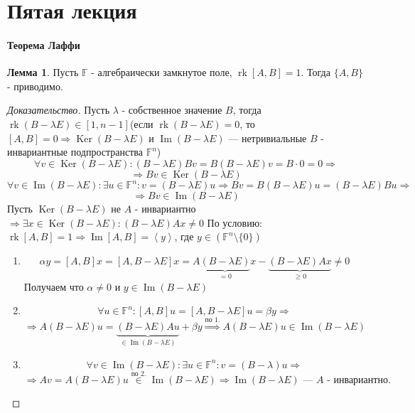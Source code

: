 \documentclass[a4paper, 14pt]{extarticle}
\theoremstyle{definition}
\newtheorem{lemma}{Лемма}
\begin{document}
\newpage

\section{Пятая лекция}
\paragraph{Теорема Лаффи}

\begin{lemma}\label{lm5_1}
	Пусть \(\mathbb{F}\) - алгебраически замкнутое поле, \(\operatorname{rk}[A, B] = 1\). Тогда \(\{A, B\}\) - приводимо.
\end{lemma}

\begin{proof}[Доказательство]
	Пусть \(\lambda\) - собственное значение \(B\), тогда \(\operatorname{rk}(B - \lambda E) \in [1, n - 1]\)(если \(\operatorname{rk}(B - \lambda E) = 0\), то \([A, B] = 0 \Rightarrow \operatorname{Ker}(B - \lambda E)\) и \(\operatorname{Im}(B - \lambda E)\) --- нетривиальные \(B\) - инвариантные подпространства \(\mathbb{F}^n\))
	\[\forall v \in \operatorname{Ker}(B - \lambda E ): (B - \lambda E) Bv = B(B - \lambda E)v = B \cdot 0 = 0 \Rightarrow\]
	\[\Rightarrow Bv \in \operatorname{Ker}(B - \lambda E)\]
	\[\forall v \in \operatorname{Im}(B - \lambda E): \exists u \in \mathbb{F}^n : v = (B - \lambda E)u \Rightarrow Bv = B(B - \lambda E)u = (B - \lambda E)Bu \Rightarrow\]
	\[\Rightarrow Bv \in \operatorname{Im}(B - \lambda E)\]
	Пусть \(\operatorname{Ker}(B - \lambda E)\) не \(A\) - инвариантно \(\Rightarrow \exists x \in \operatorname{Ker}(B - \lambda E) : (B - \lambda E) Ax \neq 0\)
	По условию: \(\operatorname{rk}[A, B] = 1 \Rightarrow \operatorname{Im}[A, B] = \left\langle y \right\rangle \), где \(y \in (\mathbb{F}^n \setminus \{0\})\)
	\begin{enumerate}
		\item \[\alpha y = [A, B]x = [A, B - \lambda E]x = A\underbrace{(B - \lambda E )}_{= 0}x - \underbrace{(B - \lambda E)Ax}_{\geqslant 0} \neq 0\]
		Получаем что \(\alpha \neq 0\) и \(y \in \operatorname{Im}(B - \lambda E)\)
		
		\item \[\forall u \in \mathbb{F}^n : [A, B]u = [A, B - \lambda E]u = \beta y \Rightarrow \] 
		\[\Rightarrow A(B - \lambda E)u = \underbrace{(B - \lambda E)Au}_{\in \operatorname{Im}(B - \lambda E)} + \beta y \overset{\text{по 1.}}{\Rightarrow} A(B - \lambda E)u \in \operatorname{Im}(B - \lambda E)\]
		
		\item \[\forall v \in \operatorname{Im}(B - \lambda E) : \exists u \in \mathbb{F}^n : v = (B - \lambda)u \Rightarrow \] \[\Rightarrow Av = A(B - \lambda E)u \overset{\text{по 2.}}{\in} \operatorname{Im}(B - \lambda E) \Rightarrow \operatorname{Im}(B - \lambda E) \text{ --- \(A\) - инвариантно.}\]
	\end{enumerate}
\end{proof}
\end{document}
